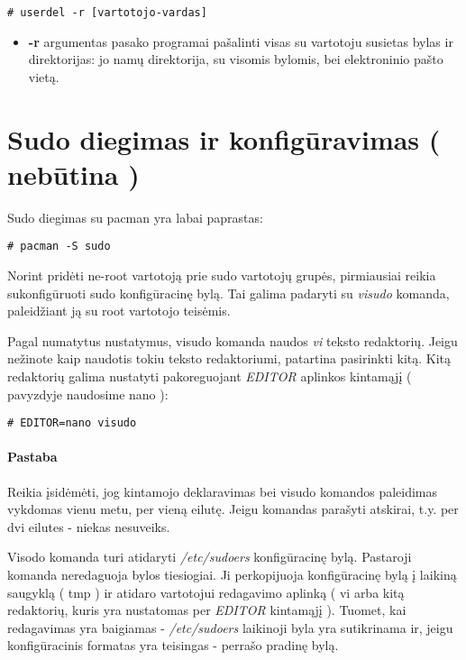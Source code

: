       \begin{verbatim}
# userdel -r [vartotojo-vardas]
      \end{verbatim}

      \begin{itemize}
        \item \textbf{-r} argumentas pasako programai pašalinti visas su
          vartotoju susietas bylas ir direktorijas: jo namų direktorija,
          su visomis bylomis, bei elektroninio pašto vietą.
      \end{itemize}

  \section{Sudo diegimas ir konfigūravimas ( nebūtina )}


    Sudo diegimas su pacman yra labai paprastas:
    
    \begin{verbatim}
# pacman -S sudo
    \end{verbatim}

    Norint pridėti ne-root vartotoją prie sudo vartotojų grupės,
    pirmiausiai reikia sukonfigūruoti sudo konfigūracinę bylą. Tai
    galima padaryti su \textsl{visudo} komanda, paleidžiant ją su root
    vartotojo teisėmis. 

    Pagal numatytus nustatymus, visudo komanda naudos \textsl{vi}
    teksto redaktorių. Jeigu nežinote kaip naudotis tokiu teksto
    redaktoriumi, patartina pasirinkti kitą. Kitą redaktorių galima
    nustatyti pakoreguojant \textsl{EDITOR} aplinkos kintamąjį (
    pavyzdyje naudosime nano ):

    \begin{verbatim}
# EDITOR=nano visudo
    \end{verbatim}

    \paragraph{Pastaba} Reikia įsidėmėti, jog kintamojo deklaravimas
    bei visudo komandos paleidimas vykdomas vienu metu, per vieną
    eilutę. Jeigu komandas parašyti atskirai, t.y. per dvi eilutes -
    niekas nesuveiks. 

    Visodo komanda turi atidaryti \textsl{/etc/sudoers} konfigūracinę
    bylą.  Pastaroji komanda neredaguoja bylos tiesiogiai. Ji
    perkopijuoja konfigūracinę bylą į laikiną saugyklą ( tmp ) ir
    atidaro vartotojui redagavimo aplinką ( vi arba kitą redaktorių,
    kuris yra nustatomas per \textsl{EDITOR} kintamąjį ). Tuomet, kai
    redagavimas yra baigiamas - \textsl{/etc/sudoers} laikinoji byla
    yra sutikrinama ir, jeigu konfigūracinis formatas yra teisingas -
    perrašo pradinę bylą.

